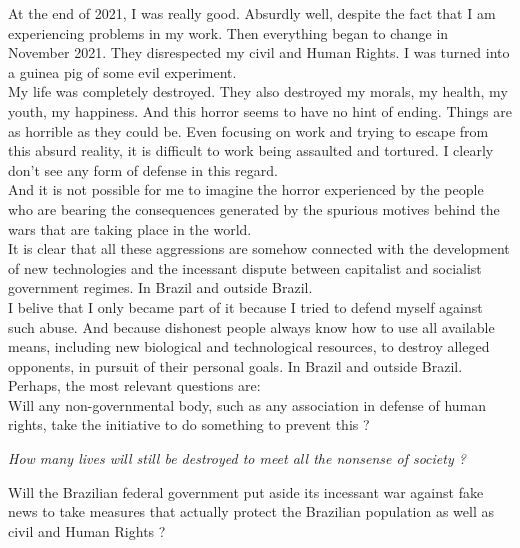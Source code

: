 \documentclass[11pt]{book}
\begin{document}
\noindent At the end of 2021, I was really good. Absurdly well, despite the fact that I am experiencing problems in my work. Then everything began to change in November 2021. They disrespected my civil and Human Rights. I was turned into a guinea pig of some evil experiment.  \\

\noindent My life was completely destroyed. They also destroyed my morals, my health, my youth, my happiness. And this horror seems to have no hint of ending.  Things are as horrible as they could be. Even focusing on work and trying to escape from this absurd reality, it is difficult to work being assaulted and tortured.  I clearly don't see any form of defense in this regard. \\

\noindent And it is not possible for me to imagine the horror experienced by the people who are bearing the consequences generated by the spurious motives behind the wars that are taking place in the world. \\

\noindent It is clear that all these aggressions are somehow connected with the development of new technologies and the incessant dispute between capitalist and socialist government regimes. In Brazil and outside Brazil. \\

\noindent I belive that I only became part of it because I tried to defend myself against such abuse. And because dishonest people always know how to use all available means, including new biological and technological resources, to destroy alleged opponents, in pursuit of their personal goals. In Brazil and outside Brazil. \\

\noindent Perhaps, the most relevant questions are: \\

\noindent Will any non-governmental body, such as any association in defense of human rights, take the initiative to do something to prevent this ?

\noindent \begin{center} \emph{How many lives will still be destroyed to meet all the nonsense of society ?} \end{center}

\noindent  Will the Brazilian federal government put aside its incessant war against fake news to take measures that actually protect the Brazilian population as well as civil and Human Rights ? \\
\end{document}
